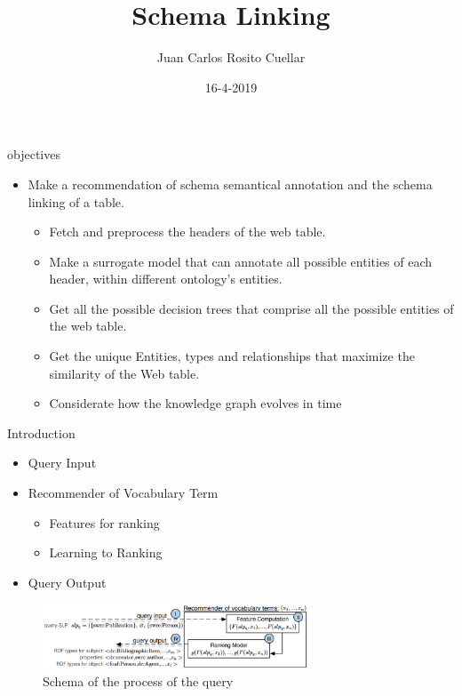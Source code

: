 \documentclass{beamer}
\title[Schema-Linking \hspace{0.5cm}\insertframenumber/\inserttotalframenumber]{Schema Linking}
\author{Juan Carlos Rosito Cuellar}
\institute{Universita' degli studi di Milano-Bicocca}
\date{16-4-2019}
\begin{document}
\begin{frame}
	\titlepage
\end{frame}



\begin{frame}{objectives}
  \begin{itemize}
	\item Make a recommendation of schema semantical annotation and the schema linking of a table.
    \begin{itemize}
		\item Fetch and preprocess the headers of the web table.
		\item Make a surrogate model that can annotate all possible entities of each header, within different ontology’s entities.
		\item Get all the possible decision trees that comprise all the possible entities of the web table.
		\item Get the unique Entities, types and relationships that maximize the similarity of the Web table.
		\item Considerate how the knowledge graph evolves in time
	\end{itemize}
    
  \end{itemize}

\end{frame}

\begin{frame}{Introduction}
  \begin{itemize}
    \item Query Input
    \item Recommender of Vocabulary Term
    \begin{itemize}
		\item Features for ranking
		\item Learning to Ranking
	\end{itemize}
    \item Query Output
  \end{itemize}
  \begin{figure}
	\includegraphics[width=8cm]{images/schema-queryinput.png}
	\caption{\label{fig:your-figure1}Schema of the process of the query}
  \end{figure}
\end{frame}
\end{document}
